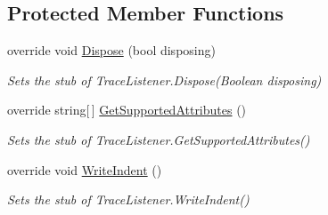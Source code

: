 \subsection*{Protected Member Functions}
\begin{DoxyCompactItemize}
\item 
override void \hyperlink{class_system_1_1_diagnostics_1_1_fakes_1_1_stub_trace_listener_a90d93318fc14fc0b8a44164bd00aec6f}{Dispose} (bool disposing)
\begin{DoxyCompactList}\small\item\em Sets the stub of Trace\-Listener.\-Dispose(\-Boolean disposing)\end{DoxyCompactList}\item 
override string\mbox{[}$\,$\mbox{]} \hyperlink{class_system_1_1_diagnostics_1_1_fakes_1_1_stub_trace_listener_a6bc37d3238ec7ce21181b2ea9d2e86b7}{Get\-Supported\-Attributes} ()
\begin{DoxyCompactList}\small\item\em Sets the stub of Trace\-Listener.\-Get\-Supported\-Attributes()\end{DoxyCompactList}\item 
override void \hyperlink{class_system_1_1_diagnostics_1_1_fakes_1_1_stub_trace_listener_a28195af64346638e991afb62ab65580c}{Write\-Indent} ()
\begin{DoxyCompactList}\small\item\em Sets the stub of Trace\-Listener.\-Write\-Indent()\end{DoxyCompactList}\end{DoxyCompactItemize}
